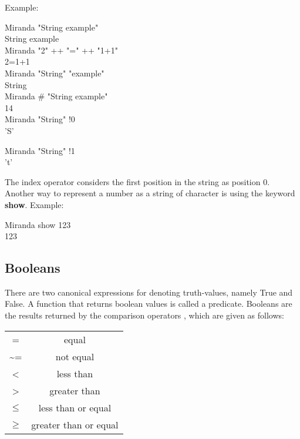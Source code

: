 \documentclass[11pt]{article}
\begin{document}
Example:
\begin{tcolorbox}
Miranda "String example" \\
String example\\

Miranda "2" ++ "=" ++ "1+1" \\
2=1+1\\

Miranda "String" \- "example"\\
String\\

Miranda \# "String example"\\
14\\

Miranda "String" !0\\
'S'

Miranda "String" !1\\
't'
\end{tcolorbox}

The index operator \! considers the first position in the string as position 0.\\

Another way to represent a number as a string of character is using the keyword \textbf{show}.
Example:

 \begin{tcolorbox}
 Miranda show 123\\
123

 \end{tcolorbox}


\subsection{Booleans}
There are two canonical expressions for denoting truth-values, namely True and False. A function that returns boolean values is called a predicate.
Booleans are the results returned by the comparison operators , which are given as follows:

\begin{center}
\begin{tabular}{|c|c|}
\hline
    = &  equal\\
    \~{}=  & not equal\\
    <  & less than\\
    >   &greater than\\
    $\leq$ &less than or equal\\
    $\geq$ &greater than or equal\\
    \hline
\end{tabular}
\end{center}
\par
\end{document}
